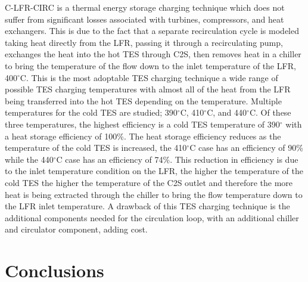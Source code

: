 \begin{paracol}{2}
C-LFR-CIRC is a thermal energy storage charging technique which does not suffer from significant losses associated with turbines, compressors, and heat exchangers. This is due to the fact that a separate recirculation cycle is modeled taking heat directly from the LFR, passing it through a recirculating pump, exchanges the heat into the hot TES through C2S, then removes heat in a chiller to bring the temperature of the flow down to the inlet temperature of the LFR, 400$^{\circ}$C. This is the most adoptable TES charging technique a wide range of possible TES charging temperatures with almost all of the heat from the LFR being transferred into the hot TES depending on the temperature. Multiple temperatures for the cold TES are studied; 390$^{\circ}$C, 410$^{\circ}$C, and 440$^{\circ}$C. Of these three temperatures, the highest efficiency is a cold TES temperature of 390$^{\circ}$ with a heat storage efficiency of 100\%. The heat storage efficiency reduces as the temperature of the cold TES is increased, the 410$^{\circ}$C case has an efficiency of 90\% while the 440$^{\circ}$C case has an efficiency of 74\%. This reduction in efficiency is due to the inlet temperature condition on the LFR, the higher the temperature of the cold TES the higher the temperature of the C2S outlet and therefore the more heat is being extracted through the chiller to bring the flow temperature down to the LFR inlet temperature. A drawback of this TES charging technique is the additional components needed for the circulation loop, with an additional chiller and circulator component, adding cost. 

\section{Conclusions}


\end{paracol}






